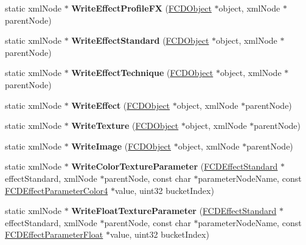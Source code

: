 \begin{DoxyCompactItemize}
\item 
\hypertarget{classFArchiveXML_acc902d6745cbe50e436ddbef3567d5b6}{
static xmlNode $\ast$ {\bfseries WriteEffectProfileFX} (\hyperlink{classFCDObject}{FCDObject} $\ast$object, xmlNode $\ast$parentNode)}
\label{classFArchiveXML_acc902d6745cbe50e436ddbef3567d5b6}

\item 
\hypertarget{classFArchiveXML_af44165c1856eae4b5f5d7b376085d58c}{
static xmlNode $\ast$ {\bfseries WriteEffectStandard} (\hyperlink{classFCDObject}{FCDObject} $\ast$object, xmlNode $\ast$parentNode)}
\label{classFArchiveXML_af44165c1856eae4b5f5d7b376085d58c}

\item 
\hypertarget{classFArchiveXML_ace2d8adb4c64a3d88025961559a3b384}{
static xmlNode $\ast$ {\bfseries WriteEffectTechnique} (\hyperlink{classFCDObject}{FCDObject} $\ast$object, xmlNode $\ast$parentNode)}
\label{classFArchiveXML_ace2d8adb4c64a3d88025961559a3b384}

\item 
\hypertarget{classFArchiveXML_a57a0a0e7e147ad980c65b0fe5b664a84}{
static xmlNode $\ast$ {\bfseries WriteEffect} (\hyperlink{classFCDObject}{FCDObject} $\ast$object, xmlNode $\ast$parentNode)}
\label{classFArchiveXML_a57a0a0e7e147ad980c65b0fe5b664a84}

\item 
\hypertarget{classFArchiveXML_a4900426f253f5d3e6a727b29d89dfe95}{
static xmlNode $\ast$ {\bfseries WriteTexture} (\hyperlink{classFCDObject}{FCDObject} $\ast$object, xmlNode $\ast$parentNode)}
\label{classFArchiveXML_a4900426f253f5d3e6a727b29d89dfe95}

\item 
\hypertarget{classFArchiveXML_a3f29e73a10d24e2f5789eca954b69657}{
static xmlNode $\ast$ {\bfseries WriteImage} (\hyperlink{classFCDObject}{FCDObject} $\ast$object, xmlNode $\ast$parentNode)}
\label{classFArchiveXML_a3f29e73a10d24e2f5789eca954b69657}

\item 
\hypertarget{classFArchiveXML_a7bbad1ce83cb804ea01f1777db4c83c4}{
static xmlNode $\ast$ {\bfseries WriteColorTextureParameter} (\hyperlink{classFCDEffectStandard}{FCDEffectStandard} $\ast$effectStandard, xmlNode $\ast$parentNode, const char $\ast$parameterNodeName, const \hyperlink{classFCDEffectParameterAnimatableT}{FCDEffectParameterColor4} $\ast$value, uint32 bucketIndex)}
\label{classFArchiveXML_a7bbad1ce83cb804ea01f1777db4c83c4}

\item 
\hypertarget{classFArchiveXML_ad9620a4f4f9e23df04cca778ff391679}{
static xmlNode $\ast$ {\bfseries WriteFloatTextureParameter} (\hyperlink{classFCDEffectStandard}{FCDEffectStandard} $\ast$effectStandard, xmlNode $\ast$parentNode, const char $\ast$parameterNodeName, const \hyperlink{classFCDEffectParameterAnimatableT}{FCDEffectParameterFloat} $\ast$value, uint32 bucketIndex)}
\label{classFArchiveXML_ad9620a4f4f9e23df04cca778ff391679}


\end{DoxyCompactItemize}
